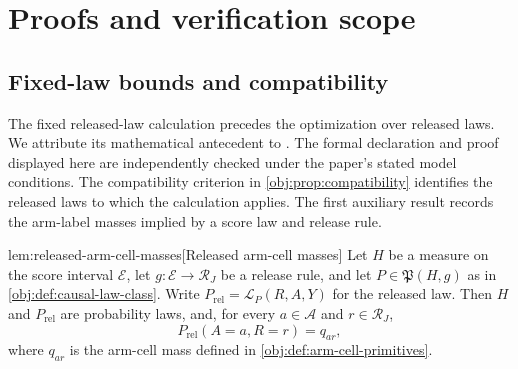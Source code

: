 \documentclass[11pt]{article}
\begin{document}
\section{Proofs and verification scope}

\subsection{Fixed-law bounds and compatibility}

The fixed released-law calculation precedes the optimization over released laws. We attribute its mathematical antecedent to \citet[Theorem 3.2 and eq. (3.1)]{FanShermanShum2014}. The formal declaration and proof displayed here are independently checked under the paper's stated model conditions. The compatibility criterion in \cref{obj:prop:compatibility} identifies the released laws to which the calculation applies. The first auxiliary result records the arm-label masses implied by a score law and release rule.

\begin{lemmav}{lem:released-arm-cell-masses}[Released arm-cell masses]
Let \(H\) be a measure on the score interval \(\mathcal E\), let \(g:\mathcal E\to\mathcal R_J\) be a release rule, and let \(P\in\mathfrak P(H,g)\) as in \cref{obj:def:causal-law-class}. Write \(P_{\mathrm{rel}}=\mathcal L_P(R,A,Y)\) for the released law. Then \(H\) and \(P_{\mathrm{rel}}\) are probability laws, and, for every \(a\in\mathcal A\) and \(r\in\mathcal R_J\),
\[
P_{\mathrm{rel}}(A=a,R=r)=q_{ar},
\]
where \(q_{ar}\) is the arm-cell mass defined in \cref{obj:def:arm-cell-primitives}.
\end{lemmav}
\end{document}
